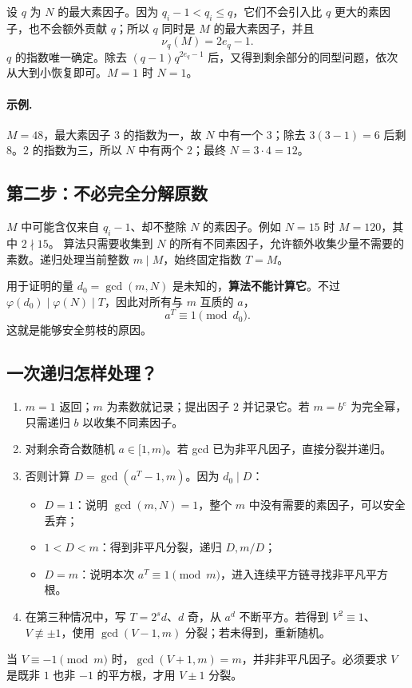 \documentclass[UTF8,a4paper,11pt,twoside,openright,fontset=fandol]{ctexbook}
\theoremstyle{definition}
\begin{document}
设 $q$ 为 $N$ 的最大素因子。因为 $q_i-1<q_i\le q$，它们不会引入比 $q$ 更大的素因子，也不会额外贡献 $q$；所以 $q$ 同时是 $M$ 的最大素因子，并且
\[
 \nu_q(M)=2e_q-1.
\]
$q$ 的指数唯一确定。除去 $(q-1)q^{2e_q-1}$ 后，又得到剩余部分的同型问题，依次从大到小恢复即可。$M=1$ 时 $N=1$。

\paragraph{示例.} $M=48$，最大素因子 $3$ 的指数为一，故 $N$ 中有一个 $3$；除去 $3(3-1)=6$ 后剩 $8$。$2$ 的指数为三，所以 $N$ 中有两个 $2$；最终 $N=3\cdot4=12$。

\subsection{第二步：不必完全分解原数}
$M$ 中可能含仅来自 $q_i-1$、却不整除 $N$ 的素因子。例如 $N=15$ 时 $M=120$，其中 $2\nmid15$。
算法只需要收集到 $N$ 的所有不同素因子，允许额外收集少量不需要的素数。递归处理当前整数 $m\mid M$，始终固定指数 $T=M$。

用于证明的量 $d_0=\gcd(m,N)$ 是未知的，\textbf{算法不能计算它}。不过 $\varphi(d_0)\mid\varphi(N)\mid T$，因此对所有与 $m$ 互质的 $a$，
\[
 a^T\equiv1\pmod{d_0}.
\]
这就是能够安全剪枝的原因。

\subsection{一次递归怎样处理？}
\begin{enumerate}
\item $m=1$ 返回；$m$ 为素数就记录；提出因子 $2$ 并记录它。若 $m=b^e$ 为完全幂，只需递归 $b$ 以收集不同素因子。
\item 对剩余奇合数随机 $a\in[1,m)$。若 gcd 已为非平凡因子，直接分裂并递归。
\item 否则计算 $D=\gcd(a^T-1,m)$。因为 $d_0\mid D$：
\begin{itemize}
\item $D=1$：说明 $\gcd(m,N)=1$，整个 $m$ 中没有需要的素因子，可以安全丢弃；
\item $1<D<m$：得到非平凡分裂，递归 $D,m/D$；
\item $D=m$：说明本次 $a^T\equiv1\pmod m$，进入连续平方链寻找非平凡平方根。
\end{itemize}
\item 在第三种情况中，写 $T=2^sd$、$d$ 奇，从 $a^d$ 不断平方。若得到 $V^2\equiv1$、$V\not\equiv\pm1$，使用 $\gcd(V-1,m)$ 分裂；若未得到，重新随机。
\end{enumerate}
\begin{pitfall}[原稿中一个使算法直接失效的符号错误]
当 $V\equiv-1\pmod m$ 时，$\gcd(V+1,m)=m$，并非非平凡因子。必须要求 $V$ 是既非 $1$ 也非 $-1$ 的平方根，才用 $V\pm1$ 分裂。
\end{pitfall}
\end{document}
